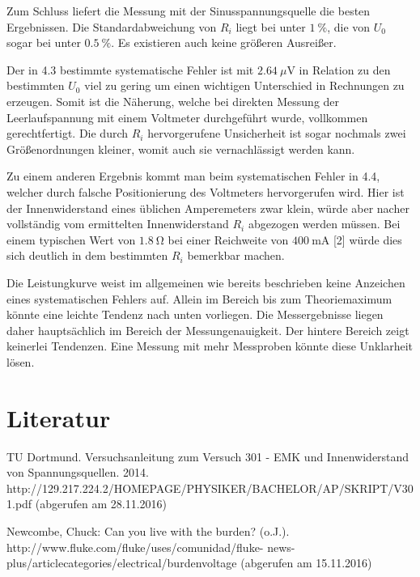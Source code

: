 Zum Schluss liefert die Messung mit der Sinusspannungsquelle die besten Ergebnissen.
Die Standardabweichung von $R_i$ liegt bei unter $\SI{1}{\%}$, die von $U_0$ sogar bei unter $\SI{0,5}{\%}$.
 Es existieren auch keine größeren Ausreißer.

Der in 4.3 bestimmte systematische Fehler ist mit $\SI{2,64}{\mu\volt}$ in Relation zu den bestimmten $U_0$ viel zu gering
um einen wichtigen Unterschied in Rechnungen zu erzeugen. Somit ist die Näherung, welche bei direkten Messung der Leerlaufspannung mit einem Voltmeter durchgeführt wurde,
 vollkommen gerechtfertigt. Die durch $R_i$ hervorgerufene Unsicherheit ist sogar nochmals
 zwei Größenordnungen kleiner, womit auch sie vernachlässigt werden kann.

 Zu einem anderen Ergebnis kommt man beim systematischen Fehler in 4.4, welcher durch falsche Positionierung des Voltmeters hervorgerufen wird.
Hier ist der Innenwiderstand eines üblichen Amperemeters zwar klein, würde aber nacher vollständig vom ermittelten Innenwiderstand $R_i$ abgezogen werden müssen.
 Bei einem typischen Wert von $\SI{1,8}{\ohm}$ bei einer Reichweite von $\SI{400}{\milli\ampere}$ [2] würde dies sich deutlich in dem bestimmten $R_i$ bemerkbar machen.

Die Leistungkurve weist im allgemeinen wie bereits beschrieben keine Anzeichen eines systematischen Fehlers auf. Allein im Bereich bis zum Theoriemaximum
könnte eine leichte Tendenz nach unten vorliegen. Die Messergebnisse liegen daher hauptsächlich
 im Bereich der Messungenauigkeit. Der hintere Bereich zeigt keinerlei Tendenzen.
 Eine Messung mit mehr Messproben könnte diese Unklarheit lösen.

\section{Literatur}
\begin{enumerate}[{[}1{]}]
	\item TU Dortmund. Versuchsanleitung zum Versuch 301 - EMK und Innenwiderstand von Spannungsquellen. 2014.\\
  http://129.217.224.2/HOMEPAGE/PHYSIKER/BACHELOR/AP/SKRIPT/V301.pdf (abgerufen am 28.11.2016)


	\item Newcombe, Chuck: Can you live with the burden? (o.J.).\\ http://www.fluke.com/fluke/uses/comunidad/fluke-
  news-plus/articlecategories/electrical/burdenvoltage (abgerufen am 15.11.2016)
\end{enumerate}
